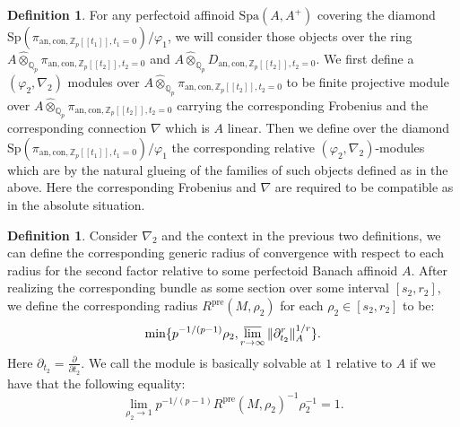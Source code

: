 \documentclass[11pt]{book}
\theoremstyle{definition}
\newtheorem{definition}[theorem]{Definition}
\numberwithin{equation}{section}
\begin{document}
\begin{definition}\label{definition6.7}
For any perfectoid affinoid $\mathrm{Spa}(A,A^+)$ covering the diamond $\mathrm{Sp}(\pi_{\mathrm{an},\mathrm{con},\mathbb{Z}_p[[t_1]],t_1=0})/\varphi_1$, we will consider those objects over the ring $A\widehat{\otimes}_{\mathbb{Q}_p}\pi_{\mathrm{an,con},\mathbb{Z}_p[[t_2]],t_2=0}$ and $A\widehat{\otimes}_{\mathbb{Q}_p}D_{\mathrm{an,con},\mathbb{Z}_p[[t_2]],t_2=0}$. We first define a $(\varphi_2,\nabla_2)$ modules over $A\widehat{\otimes}_{\mathbb{Q}_p}\pi_{\mathrm{an,con},\mathbb{Z}_p[[t_2]],t_2=0}$ to be finite projective module over $A\widehat{\otimes}_{\mathbb{Q}_p}\pi_{\mathrm{an,con},\mathbb{Z}_p[[t_2]],t_2=0}$ carrying the corresponding Frobenius and the corresponding connection $\nabla$   which is $A$ linear. Then we define over the diamond $\mathrm{Sp}(\pi_{\mathrm{an},\mathrm{con},\mathbb{Z}_p[[t_1]],t_1=0})/\varphi_1$ the corresponding relative $(\varphi_2,\nabla_2)$-modules which are by the natural glueing of the families of such objects defined as in the above. Here the corresponding Frobenius and $\nabla$ are required to be compatible as in the absolute situation.
\end{definition}


\begin{definition}
Consider $\nabla_2$ and the context in the previous two definitions, we can define the corresponding generic radius of convergence with respect to each radius for the second factor relative to some perfectoid Banach affinoid $A$. After realizing the corresponding bundle as some section over some interval $[s_2,r_2]$, we define the corresponding radius $R^{\mathrm{pre}}(M,\rho_2)$ for each $\rho_2\in [s_2,r_2]$ to be:
\begin{align}
\min \{p^{-1/(p-1)}\rho_2,\varlimsup_{r\rightarrow \infty}\|{\partial_{t_2}^r}\|_{A}^{1/r}\}.	
\end{align}
Here $\partial_{t_2}=\frac{\partial}{\partial{t_2}}$. We call the module is basically solvable at $1$ relative to $A$ if we have that the following equality:
\begin{displaymath}
\lim_{\rho_2\rightarrow 1}p^{-1/(p-1)}R^\mathrm{pre}(M,\rho_2)^{-1}\rho_2^{-1}=1.	
\end{displaymath}	

\end{definition}
\end{document}
